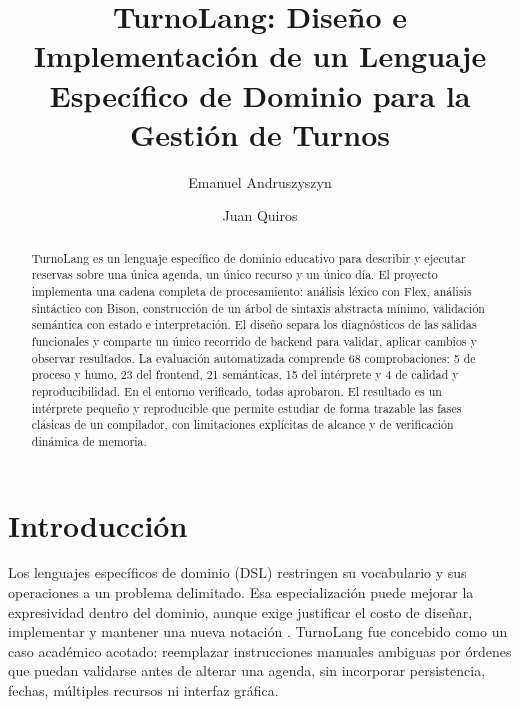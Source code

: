\documentclass[runningheads]{llncs}
\begin{document}
\title{TurnoLang: Diseño e Implementación de un Lenguaje Específico de Dominio para la Gestión de Turnos}
\author{Emanuel Andruszyszyn \and Juan Quiros}
\maketitle

\begin{abstract}
TurnoLang es un lenguaje específico de dominio educativo para describir y
ejecutar reservas sobre una única agenda, un único recurso y un único día. El
proyecto implementa una cadena completa de procesamiento: análisis léxico con
Flex, análisis sintáctico con Bison, construcción de un árbol de sintaxis
abstracta mínimo, validación semántica con estado e interpretación. El diseño
separa los diagnósticos de las salidas funcionales y comparte un único
recorrido de backend para validar, aplicar cambios y observar resultados. La
evaluación automatizada comprende 68 comprobaciones: 5 de proceso y humo, 23
del frontend, 21 semánticas, 15 del intérprete y 4 de calidad y
reproducibilidad. En el entorno verificado, todas aprobaron. El resultado es un
intérprete pequeño y reproducible que permite estudiar de forma trazable las
fases clásicas de un compilador, con limitaciones explícitas de alcance y de
verificación dinámica de memoria.

\end{abstract}

\section{Introducción}

Los lenguajes específicos de dominio (DSL) restringen su vocabulario y sus
operaciones a un problema delimitado. Esa especialización puede mejorar la
expresividad dentro del dominio, aunque exige justificar el costo de diseñar,
implementar y mantener una nueva notación \cite{mernik2005dsl}. TurnoLang fue
concebido como un caso académico acotado: reemplazar instrucciones manuales
ambiguas por órdenes que puedan validarse antes de alterar una agenda, sin
incorporar persistencia, fechas, múltiples recursos ni interfaz gráfica.
\end{document}
